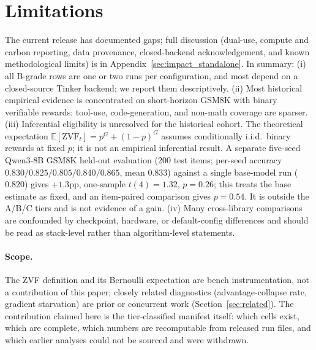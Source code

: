 \documentclass{article}
\begin{document}


\section{Limitations}
\label{sec:limitations}

The current release has documented gaps; full discussion (dual-use,
compute and carbon reporting, data provenance, closed-backend
acknowledgement, and known methodological limits) is in
Appendix~\ref{sec:impact_standalone}. In summary: (i) all B-grade rows are one or two runs per
configuration, and most depend on a closed-source Tinker backend; we report them
descriptively. (ii) Most historical empirical evidence is concentrated on
short-horizon GSM8K with binary verifiable rewards; tool-use,
code-generation, and non-math coverage are sparser. (iii) Inferential
eligibility is unresolved for the historical cohort. The theoretical
expectation $\mathbb E[\mathrm{ZVF}_t] = p^G + (1{-}p)^G$
assumes conditionally i.i.d.\ binary rewards at fixed $p$; it is not
an empirical inferential result. A separate five-seed Qwen3-8B GSM8K
held-out evaluation (200 test items; per-seed accuracy
$0.830/0.825/0.805/0.840/0.865$, mean $0.833$) against a single base-model
run ($0.820$) gives $+1.3$pp, one-sample $t(4){=}1.32$, $p{=}0.26$; this
treats the base estimate as fixed, and an item-paired comparison gives
$p{=}0.54$. It is outside the A/B/C tiers and is not evidence of a gain. (iv) Many
cross-library comparisons are confounded by
checkpoint, hardware, or default-config differences and should be read
as stack-level rather than algorithm-level statements.

\paragraph{Scope.}
The ZVF definition and its Bernoulli expectation are bench
instrumentation, not a contribution of this paper; closely related
diagnostics (advantage-collapse rate, gradient starvation) are prior or
concurrent work (Section~\ref{sec:related}). The contribution claimed here
is the tier-classified manifest itself: which cells exist, which are
complete, which numbers are recomputable from released run files, and which
earlier analyses could not be sourced and were withdrawn.


\end{document}
